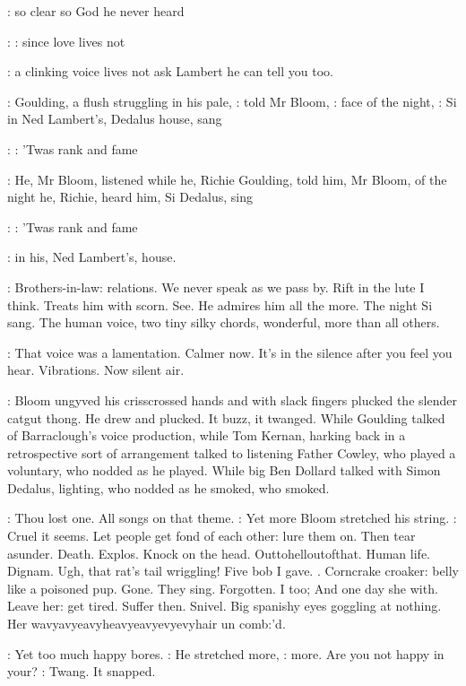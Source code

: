 \BloomInt:
so clear so God he never heard

\Simon:
\Song:
since love lives not

\BloomInt:
a clinking voice lives
not ask Lambert he can tell you too.

:
Goulding, a flush struggling in his pale,
:
told Mr Bloom,
:
face of the night,
\Goulding:
Si in Ned Lambert's, Dedalus house, sang

\Simon:
\Song:
'Twas rank and fame

:
He, Mr Bloom, listened while he, Richie Goulding, told him, Mr
Bloom, of the night he, Richie, heard him, Si Dedalus, sing

\Simon:
\Song:
'Twas rank and fame

:
in his, Ned Lambert's, house.

\BloomInt:
Brothers-in-law: relations. We never speak as we pass by. Rift in the
lute I think. Treats him with scorn.
See. He admires him all the more. The
night Si sang. The human voice, two tiny silky chords, wonderful, more
than all others.

\BloomInt:
That voice was a lamentation. Calmer now. It's in the silence after
you feel you hear. Vibrations. Now silent air.

:
Bloom ungyved his crisscrossed hands and with slack fingers plucked
the slender catgut thong. He drew and plucked. It buzz, it twanged. While
Goulding talked of Barraclough's voice production, while Tom Kernan,
harking back in a retrospective sort of arrangement talked to listening
Father Cowley, who played a voluntary, who nodded as he played. While
big Ben Dollard talked with Simon Dedalus, lighting,
who nodded as he
smoked, who smoked.

\BloomInt:
Thou lost one. All songs on that theme.
:
Yet more Bloom stretched his string.
\BloomInt:
Cruel it seems. Let people get fond of each other: lure them on.
Then tear asunder. Death. Explos. Knock on the head. Outtohelloutofthat.
Human life. Dignam. Ugh, that rat's tail wriggling! Five bob I gave.
.
Corncrake croaker: belly like a poisoned pup. Gone.
They sing. Forgotten. I too; And one day she with. Leave her: get tired.
Suffer then. Snivel. Big spanishy eyes goggling at nothing. Her
wavyavyeavyheavyeavyevyevyhair un comb:'d.

\BloomInt:
Yet too much happy bores.
:
He stretched more,
\BloomInt:
more. Are you not happy in your?
:
Twang. It snapped.

